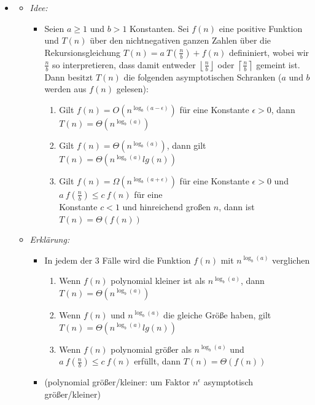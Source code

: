 \documentclass[
    ngerman,
    color=3b,
    load_common, %
    summary,
    boxarc,
]{tuda_summary}
\begin{document}
\begin{itemize}
    \item {}
          \begin{itemize}
              \item \textit{Idee:}
                    \begin{itemize}
                        \item[]
                              Seien $a \geq 1$ und $b > 1$ Konstanten. Sei $f(n)$ eine positive Funktion und $T(n)$
                              über den nichtnegativen ganzen Zahlen über die Rekursionsgleichung $T(n) = a~T(\frac{n}{b}) + f(n)$
                              defininiert, wobei wir $\frac{n}{b}$ so interpretieren, dass damit entweder $\left \lfloor \frac{n}{b} \right \rfloor$
                              oder $\left \lceil \frac{n}{b} \right \rceil$ gemeint ist. Dann besitzt $T(n)$ die folgenden asymptotischen Schranken
                              ($a$ und $b$ werden aus $f(n)$ gelesen):
                              \begin{enumerate}
                                  \item Gilt $f(n) = O(n^{\log_b (a - \epsilon)})$ für eine Konstante $\epsilon > 0$, dann $T(n) = \Theta(n^{\log_b (a)})$
                                  \item Gilt $f(n) = \Theta(n^{\log_b (a)})$, dann gilt $T(n) = \Theta(n^{\log_b (a)} lg(n))$
                                  \item Gilt $f(n) = \Omega(n^{\log_b (a+\epsilon)})$ für eine Konstante $\epsilon > 0$ und $a~f(\frac{n}{b}) \leq c~f(n)$
                                        für eine \\ Konstante $c < 1$ und hinreichend großen $n$, dann ist $T(n) = \Theta(f(n))$
                              \end{enumerate}
                    \end{itemize}

              \item \textit{Erklärung:}
                    \begin{itemize}
                        \item In jedem der 3 Fälle wird die Funktion $f(n)$ mit $n^{\log_b(a)}$ verglichen
                              \begin{enumerate}
                                  \item Wenn $f(n)$ polynomial kleiner ist als $n^{\log_b(a)}$, dann $T(n) = \Theta(n^{\log_b(a)})$
                                  \item Wenn $f(n)$ und $n^{\log_b(a)}$ die gleiche Größe haben, gilt $T(n) = \Theta(n^{\log_b (a)} lg(n))$
                                  \item Wenn $f(n)$ polynomial größer als $n^{\log_b(a)}$ und $a~f(\frac{n}{b}) \leq c~f(n)$ erfüllt, dann $T(n) = \Theta(f(n))$
                              \end{enumerate}
                        \item (polynomial größer/kleiner: um Faktor $n^\epsilon$ asymptotisch größer/kleiner)
                    \end{itemize}


\end{itemize}
\end{itemize}
\end{document}
